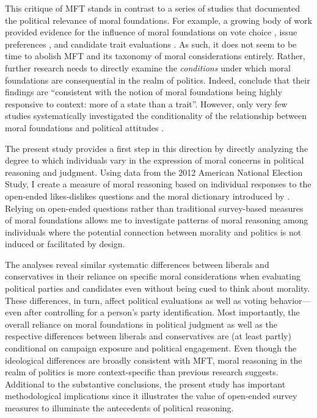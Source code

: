 \documentclass[12pt]{article}
\begin{document}
This critique of MFT stands in contrast to a series of studies that documented the political relevance of moral foundations. For example, a growing body of work provided evidence for the influence of moral foundations on vote choice \citep{iyer2010beyond, franks2015using}, issue preferences \citep{koleva2012tracing, low2015moral, clifford2015concerns}, and candidate trait evaluations \citep{clifford2014linking}. As such, it does not seem to be time to abolish MFT and its taxonomy of moral considerations entirely. Rather, further research needs to directly examine the \textit{conditions} under which moral foundations are consequential in the realm of politics. Indeed, \citet{smith2016intuitive} conclude that their findings are ``consistent with the notion of moral foundations being highly responsive to context: more of a state than a trait''. However, only very few studies systematically investigated the conditionality of the relationship between moral foundations and political attitudes \citep[see][for a notable exception]{clifford2015concerns}.

The present study provides a first step in this direction by directly analyzing the degree to which individuals vary in the expression of moral concerns in political reasoning and judgment. Using data from the 2012 American National Election Study, I create a measure of moral reasoning based on individual responses to the open-ended likes-dislikes questions and the moral dictionary introduced by \citet{graham2009liberals}. Relying on open-ended questions rather than traditional survey-based measures of moral foundations allows me to investigate patterns of moral reasoning among individuals where the potential connection between morality and politics is not induced or facilitated by design.

The analyses reveal similar systematic differences between liberals and conservatives in their reliance on specific moral considerations when evaluating political parties and candidates even without being cued to think about morality.
These differences, in turn, affect political evaluations as well as voting behavior---even after controlling for a person’s party identification. Most importantly, the overall reliance on moral foundations in political judgment as well as the respective differences between liberals and conservatives are (at least partly) conditional on campaign exposure and political engagement. Even though the ideological differences are broadly consistent with MFT, moral reasoning in the realm of politics is more context-specific than previous research suggests. Additional to the substantive conclusions, the present study has important methodological implications since it illustrates the value of open-ended survey measures to illuminate the antecedents of political reasoning.
\end{document}

